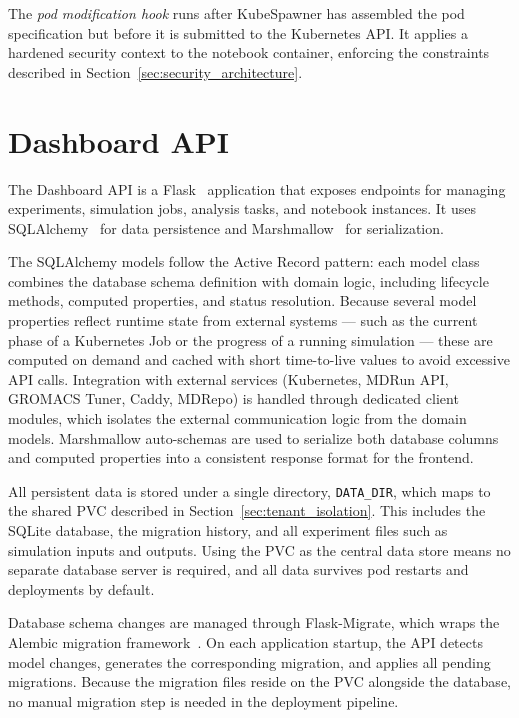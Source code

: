 \documentclass[
  digital,     %
  color,       %
  oneside,     %
  nosansbold,  %
  nocolorbold, %
  lof,         %
  lot,         %
]{fithesis4}
\begin{document}
The \textit{pod modification hook} runs after KubeSpawner has assembled the pod specification but before it is submitted to the Kubernetes API. It applies a hardened security context to the notebook container, enforcing the constraints described in Section~\ref{sec:security_architecture}.

\section{Dashboard API}
\label{sec:dashboard_api}

The Dashboard API is a Flask~\cite{flask} application that exposes endpoints for managing experiments, simulation jobs, analysis tasks, and notebook instances. It uses SQLAlchemy~\cite{sqlalchemy} for data persistence and Marshmallow~\cite{marshmallow} for serialization.

The SQLAlchemy models follow the Active Record pattern: each model class combines the database schema definition with domain logic, including lifecycle methods, computed properties, and status resolution. Because several model properties reflect runtime state from external systems --- such as the current phase of a Kubernetes Job or the progress of a running simulation --- these are computed on demand and cached with short time-to-live values to avoid excessive API calls. Integration with external services (Kubernetes, MDRun API, GROMACS Tuner, Caddy, MDRepo) is handled through dedicated client modules, which isolates the external communication logic from the domain models. Marshmallow auto-schemas are used to serialize both database columns and computed properties into a consistent response format for the frontend.

All persistent data is stored under a single directory, \texttt{DATA\_DIR}, which maps to the shared PVC described in Section~\ref{sec:tenant_isolation}. This includes the SQLite database, the migration history, and all experiment files such as simulation inputs and outputs. Using the PVC as the central data store means no separate database server is required, and all data survives pod restarts and deployments by default.

Database schema changes are managed through Flask-Migrate, which wraps the Alembic migration framework~\cite{alembic}. On each application startup, the API detects model changes, generates the corresponding migration, and applies all pending migrations. Because the migration files reside on the PVC alongside the database, no manual migration step is needed in the deployment pipeline.
\end{document}
